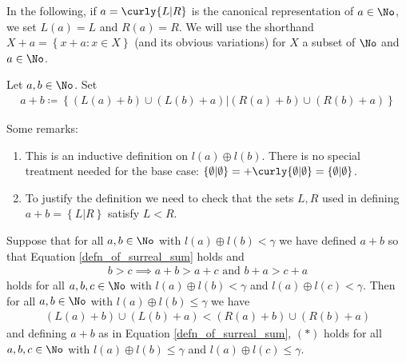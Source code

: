 In the following, if $a = \curly{L \vert R}$ is the canonical 
representation of $a \in \No$, we set $L(a) = L$ and 
$R(a) = R$. We will use the shorthand $X + a = 
\left\{ x + a \colon x \in X \right\}$ (and its obvious 
variations) for $X$ a subset of 
$\No$ and $a \in \No$. 

\begin{defn}
	Let $a, b \in \No$. Set
	\begin{align}
		a + b \coloneq 
		\left\{ (L(a) + b) \cup (L(b) + a) \vert 
		(R(a) + b) \cup (R(b) + a) \right\}
		\label{defn_of_surreal_sum}
	\end{align}
\end{defn}
Some remarks: 
\begin{enumerate}[(1)]
	\item This is an inductive definition on $l(a) \oplus l(b)$. 
		There is no special treatment needed for the base 
		case: $\left\{ \emptyset \vert \emptyset \right\} = 
		+ \curly{\emptyset \vert \emptyset} = 
		\left\{ \emptyset \vert \emptyset \right\}$. 
	\item To justify the definition we need to check that 
		the sets $L, R$ used in defining $a + b = 
		\left\{ L \vert R \right\}$ satisfy $L < R$. 
\end{enumerate}
\begin{lem}
	Suppose that for all $a, b \in \No$ with $l(a) \oplus 
	l(b) < \gamma$ we have defined $a + b$ so that 
	Equation \ref{defn_of_surreal_sum} holds and 
	\begin{align*}
		b > c \implies a + b > a + c 
		\text{ and } b + a > c + a
		\tag{$*$}
	\end{align*}
	holds for all $a, b, c \in \No$ with $l(a) \oplus 
	l(b) < \gamma$ and $l(a) \oplus l(c) < \gamma$. Then 
	for all $a, b \in \No$ with $l(a) \oplus l(b) \leq \gamma$ we have 
	\begin{align*}
		(L(a) + b) \cup (L(b) + a) < 
		(R(a) + b) \cup (R(b) + a)
	\end{align*}
	and defining $a + b$ as in Equation \ref{defn_of_surreal_sum}, 
	$(*)$ holds for all $a, b, c \in \No$ with $l(a) \oplus 
	l(b) \leq \gamma$ and $l(a) \oplus l(c) \leq \gamma$. 
\end{lem}
